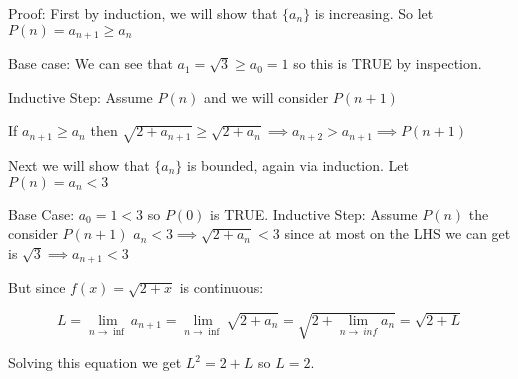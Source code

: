 \documentclass[10pt,a4paper]{article}
\begin{document}
\begin{enumerate}
        Proof: First by induction, we will show that $\{ a_n \}$ is increasing. So let $P(n) = a_{n+1} \geq a_{n}$

        Base case:  We can see that $a_1 = \sqrt{3} \geq a_0 = 1$ so this is TRUE by inspection.

        Inductive Step: Assume $P(n)$ and we will consider $P(n+1)$

        If $a_{n+1} \geq a_{n}$ then $\sqrt{2 + a_{n+1}} \geq \sqrt{2 + a_n}  \implies a_{n+2} > a_{n+1} \implies P(n+1)$

        Next we will show that $\{ a_n \}$ is bounded, again via induction. Let $P(n) = a_n < 3$

        Base Case: $a_0 = 1 < 3$ so $P(0)$ is TRUE.
        Inductive Step: Assume $P(n)$ the consider $P(n+1)$
        $a_n < 3 \implies \sqrt{2+a_n} < 3$ since at most on the LHS we can get is $\sqrt3 \implies a_{n+1} < 3$

        But since $f(x) = \sqrt{2+ x}$ is continuous:

        $$ L = \lim_{n \to \inf} a_{n+1} = \lim_{n \to \inf}\sqrt{2+a_n} = \sqrt{2+\lim_{n \to\ inf}a_n}  = \sqrt{2+L}$$

        Solving this equation we get $L^2 = 2+L$ so $L = 2$.




\end{enumerate}
\end{document}
